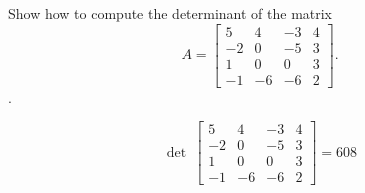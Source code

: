 
\begin{exerciseStatement}


Show how to compute the determinant of the matrix \[A= \left[\begin{array}{cccc}
5 & 4 & -3 & 4 \\
-2 & 0 & -5 & 3 \\
1 & 0 & 0 & 3 \\
-1 & -6 & -6 & 2
\end{array}\right] .\].


\end{exerciseStatement}
    
\begin{exerciseAnswer} 
\[\operatorname{det}\  \left[\begin{array}{cccc}
5 & 4 & -3 & 4 \\
-2 & 0 & -5 & 3 \\
1 & 0 & 0 & 3 \\
-1 & -6 & -6 & 2
\end{array}\right] = 608 \]
\end{exerciseAnswer}
    
